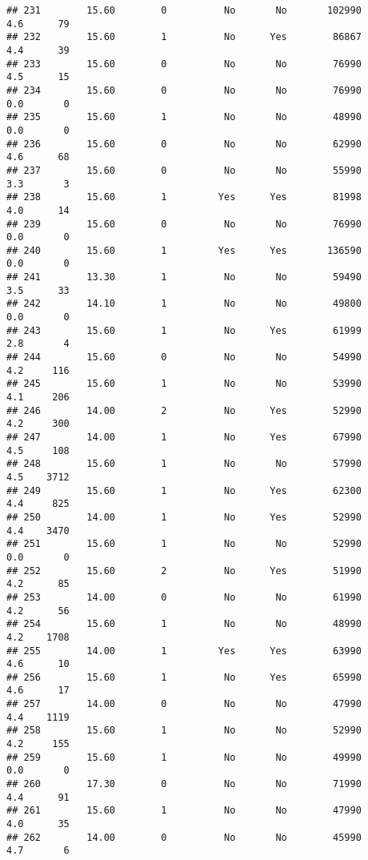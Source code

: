 \documentclass[
]{article}
\begin{document}
\begin{verbatim}
## 231        15.60        0          No       No       102990         4.6      79
## 232        15.60        1          No      Yes        86867         4.4      39
## 233        15.60        0          No       No        76990         4.5      15
## 234        15.60        0          No       No        76990         0.0       0
## 235        15.60        1          No       No        48990         0.0       0
## 236        15.60        0          No       No        62990         4.6      68
## 237        15.60        0          No       No        55990         3.3       3
## 238        15.60        1         Yes      Yes        81998         4.0      14
## 239        15.60        0          No       No        76990         0.0       0
## 240        15.60        1         Yes      Yes       136590         0.0       0
## 241        13.30        1          No       No        59490         3.5      33
## 242        14.10        1          No       No        49800         0.0       0
## 243        15.60        1          No      Yes        61999         2.8       4
## 244        15.60        0          No       No        54990         4.2     116
## 245        15.60        1          No       No        53990         4.1     206
## 246        14.00        2          No      Yes        52990         4.2     300
## 247        14.00        1          No      Yes        67990         4.5     108
## 248        15.60        1          No       No        57990         4.5    3712
## 249        15.60        1          No      Yes        62300         4.4     825
## 250        14.00        1          No      Yes        52990         4.4    3470
## 251        15.60        1          No       No        52990         0.0       0
## 252        15.60        2          No      Yes        51990         4.2      85
## 253        14.00        0          No       No        61990         4.2      56
## 254        15.60        1          No       No        48990         4.2    1708
## 255        14.00        1         Yes      Yes        63990         4.6      10
## 256        15.60        1          No      Yes        65990         4.6      17
## 257        14.00        0          No       No        47990         4.4    1119
## 258        15.60        1          No       No        52990         4.2     155
## 259        15.60        1          No       No        49990         0.0       0
## 260        17.30        0          No       No        71990         4.4      91
## 261        15.60        1          No       No        47990         4.0      35
## 262        14.00        0          No       No        45990         4.7       6

\end{verbatim}
\end{document}
